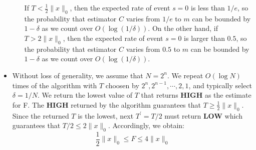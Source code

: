 \documentclass[12pt]{article}
\newenvironment{solution}[2][Solution]{\begin{trivlist}
\item[\hskip \labelsep {\bfseries #1}\hskip \labelsep {\bfseries #2.}]}{\end{trivlist}}
\begin{document}
\begin{solution}{2}
\begin{itemize}
\begin{itemize}
                        If $T < \frac12 \|x\|_0$, then the expected rate of event $s=0$ is less than $1/e$, so the probability that estimator $C$ varies from $1/e$ to $m$ can be bounded by $1-\delta$ as we count
                        over $O(\log (1/\delta))$. On the other hand, if $T > 2\|x\|_0$, then the expected rate of event $s=0$ is larger than $0.5$, so the probability that estimator $C$ varies from $0.5$ to $m$ can be bounded by $1-\delta$ as we count
                        over $O(\log (1/\delta))$.
              \end{itemize}
        \item Without loss of generality, we assume that $N=2^n$. We repeat $O(\log N)$ times of the algorithm with $T$ choosen by $2^n, 2^{n-1}, \cdots, 2, 1$, and typically
              select $\delta = 1/N$. We return the lowest value of $T$ that returns \textbf{HIGH} as the estimate for F. The \textbf{HIGH} returned by the algorithm guarantees that
              $T \ge \frac12 \|x\|_0$. Since the returned $T$ is the lowest, next $T^{\prime}=T/2$ must return \textbf{LOW} which guarantees that $T/2 \le 2\|x\|_0$. Accordingly, we obtain:
              \[\frac12 \|x\|_0 \le F \le 4 \|x\|_0\]
    \end{itemize}
\end{solution}
\end{document}

